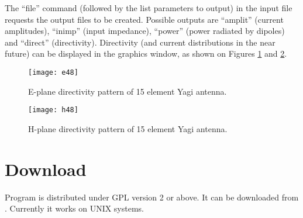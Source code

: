 \documentclass{article}
\begin{document}
The ``file'' command (followed by the list parameters to output) in
the input file requests the output files to be created. Possible
outputs are ``amplit'' (current amplitudes), ``inimp'' (input
impedance), ``power'' (power radiated by dipoles) and ``direct''
(directivity). Directivity (and current distributions in the near
future) can be displayed in the graphics window, as shown on Figures
\ref{fig:e48} and \ref{fig:h48}.

\begin{figure}
  \texttt{[image: e48]}
  \caption{\label{fig:e48}E-plane directivity pattern of 15 element
    Yagi antenna.}
\end{figure}

\begin{figure}
  \texttt{[image: h48]}
  \caption{\label{fig:h48}H-plane directivity pattern of 15 element
    Yagi antenna.}
\end{figure}

\section{Download}

Program is distributed under GPL version 2 or above. It can be
downloaded from
.
Currently it works on UNIX systems.
\end{document}
